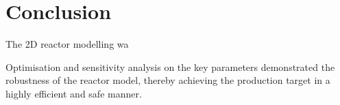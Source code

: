 \section{Conclusion} \label{sec:conclusion}

The 2D reactor modelling wa

Optimisation and sensitivity analysis on the key parameters demonstrated the robustness of the reactor model, thereby achieving the production target in a highly efficient and safe manner. 